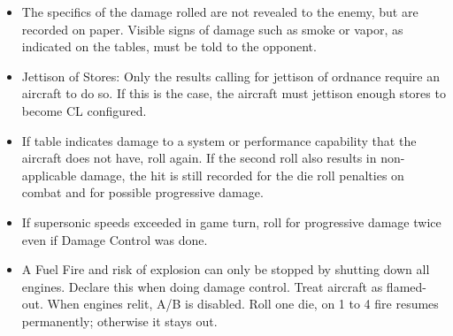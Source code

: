 {\begin{twocolumntablefloat}
\begin{twocolumntable}
\begin{tablenote}{\linewidth}
\begin{itemize}
    \item The specifics of the damage rolled are not revealed to the enemy, but are recorded on paper. Visible signs of damage such as smoke or vapor, as indicated on the tables, must be told to the opponent.
    \item Jettison of Stores: Only the results calling for jettison of ordnance require an aircraft to do so. If this is the case, the aircraft must jettison enough stores to become CL configured. 
    \item If table indicates damage to a system or performance capability that the aircraft does not have, roll again. If the second roll also results in non-applicable damage, the hit is still recorded for the die roll penalties on combat and for possible progressive damage.
   \item[\asteriskmark] If supersonic speeds exceeded in game turn, roll for progressive damage twice even if Damage Control was done.
   \item[\doubleasteriskmark] A Fuel Fire and risk of explosion can only be stopped by shutting down all engines. Declare this when doing damage control. Treat aircraft as flamed-out. When engines relit, A/B is disabled. Roll one die, on 1 to 4 fire resumes permanently; otherwise it stays out.  

\end{itemize}
\end{tablenote}


\end{twocolumntable}
\end{twocolumntablefloat}

}
